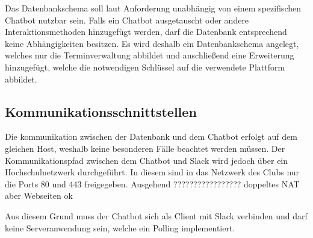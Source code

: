 Das Datenbankschema soll laut Anforderung unabhängig von einem spezifischen Chatbot nutzbar sein. Falls ein Chatbot ausgetauscht oder andere Interaktionsmethoden hinzugefügt werden, darf die Datenbank entsprechend keine Abhängigkeiten besitzen. Es wird deshalb ein Datenbankschema angelegt, welches nur die Terminverwaltung abbildet und anschließend eine Erweiterung hinzugefügt, welche die notwendigen Schlüssel auf die verwendete Plattform abbildet.


\subsection{Kommunikationsschnittstellen}

Die kommunikation zwischen der Datenbank und dem Chatbot erfolgt auf dem gleichen Host, weshalb keine besonderen Fälle beachtet werden müssen. Der Kommunikationspfad zwischen dem Chatbot und Slack wird jedoch über ein Hochschulnetzwerk durchgeführt. In diesem sind in das Netzwerk des Clubs nur die Ports 80 und 443 freigegeben. Ausgehend ????????????????? doppeltes NAT aber Webseiten ok

Aus diesem Grund muss der Chatbot sich als Client mit Slack verbinden und darf keine Serveranwendung sein, welche ein Polling implementiert.

